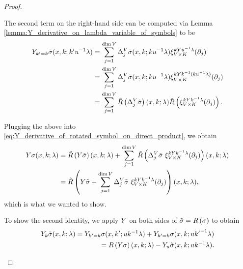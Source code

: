 \begin{proof}
\begin{enumerate}
            The second term on the right-hand side can be computed via Lemma \ref{lemma:Y_derivative_on_lambda_variable_of_symbols} to be
            \begin{align*}
                \LeftDifferentialOperatorFirstOrder Y_{k' = k} \tilde \sigma(x, k; k' u^{-1} \lambda)
                &= \sum_{j = 1}^{\dim \VectorSpace} \DifferenceOperator[\VectorSpace]{j} \tilde \sigma(x, k; k u^{-1} \lambda) \Rep[\GroupDirect]{k Y u^{-1} \lambda} (\partial_j)\\
                &= \sum_{j = 1}^{\dim \VectorSpace} \DifferenceOperator[\VectorSpace]{j} \tilde \sigma(x, k; k u^{-1} \lambda) \Rep[\GroupDirect]{k Y k^{-1} (k u^{-1} \lambda)} (\partial_j)\\
                &= \sum_{j = 1}^{\dim \VectorSpace} \Rotation {\DifferenceOperator[\VectorSpace]{j} \tilde \sigma} (x, k; \lambda) \Rotation {\Rep[\GroupDirect]{k Y k^{-1} \lambda} (\partial_j)}.
            \end{align*}

            Plugging the above into \eqref{eq:Y_derivative_of_rotated_symbol_on_direct_product}, we obtain
            \begin{align*}
                \LeftDifferentialOperatorFirstOrder Y \sigma(x, k; \lambda)
                &= \Rotation {\LeftDifferentialOperatorFirstOrder Y \tilde \sigma}(x, k; \lambda)
                + \sum_{j = 1}^{\dim \VectorSpace} \Rotation {\DifferenceOperator[\VectorSpace]{j} \tilde \sigma \ \Rep[\GroupDirect]{k Y k^{-1} \lambda} (\partial_j)}(x, k; \lambda)\\
                &= \Rotation {\LeftDifferentialOperatorFirstOrder Y \tilde \sigma
                    + \sum_{j = 1}^{\dim \VectorSpace} \DifferenceOperator[\VectorSpace]{j} \tilde \sigma \ \Rep[\GroupDirect]{k Y k^{-1} \lambda} (\partial_j)
                }(x, k; \lambda),
            \end{align*}
            which is what we wanted to show.

            To show the second identity,
            we apply $\LeftDifferentialOperatorFirstOrder Y$ on both sides of $\tilde \sigma = \InverseRotation {\sigma}$ to obtain
            \begin{align*}
                \LeftDifferentialOperatorFirstOrder Y_k \tilde \sigma(x, k; \lambda)
                = \LeftDifferentialOperatorFirstOrder Y_{k' = k} \sigma(x, k'; u k^{-1} \lambda) + \LeftDifferentialOperatorFirstOrder Y_{k' = k} \sigma(x, k; u {k'}^{-1} \lambda) \notag\\
                = \InverseRotation {\LeftDifferentialOperatorFirstOrder Y \sigma}(x, k; \lambda) - \LeftDifferentialOperatorFirstOrder Y_{u} \tilde \sigma(x, k; u k^{-1} \lambda).
                \label{eq:Y_derivative_of_rotated_symbol_on_semi-direct_product}
            \end{align*}


\end{enumerate}
\end{proof}

